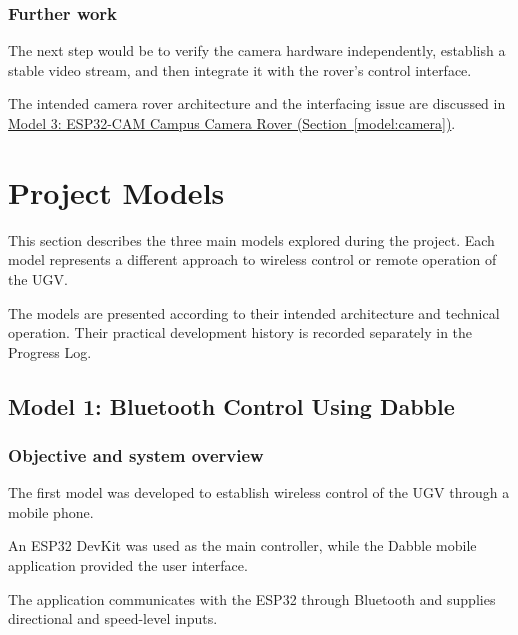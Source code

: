 \documentclass[11pt,a4paper]{article}
\begin{document}
\subsubsection{Further work}

The next step would be to verify the camera hardware
independently, establish a stable video stream, and
then integrate it with the rover's control interface.

The intended camera rover architecture and the
interfacing issue are discussed in
\hyperref[model:camera]{Model 3: ESP32-CAM Campus
Camera Rover (Section~\ref*{model:camera})}.



\section{Project Models}
\label{sec:project-models}

This section describes the three main models explored
during the project. Each model represents a different
approach to wireless control or remote operation
of the UGV.

The models are presented according to their intended
architecture and technical operation. Their practical
development history is recorded separately in the
Progress Log.



\subsection{Model 1: Bluetooth Control Using Dabble}
\label{model:bluetooth}

\subsubsection{Objective and system overview}

The first model was developed to establish wireless
control of the UGV through a mobile phone.

An ESP32 DevKit was used as the main controller,
while the Dabble mobile application provided the
user interface.

The application communicates with the ESP32 through
Bluetooth and supplies directional and speed-level
inputs.
\end{document}
